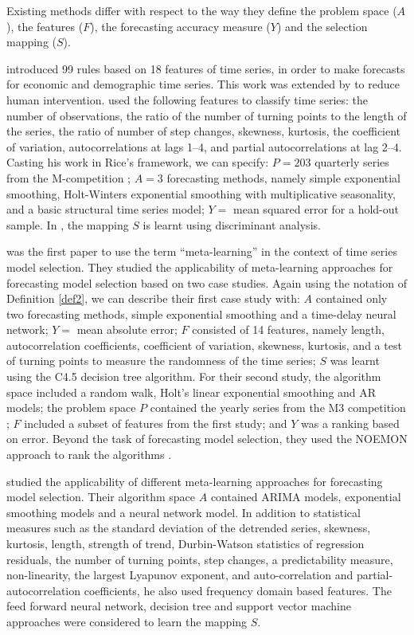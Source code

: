 \documentclass[11pt,a4paper,]{article}
\theoremstyle{definition}
\theoremstyle{definition}
\theoremstyle{definition}
\theoremstyle{remark}
\begin{document}
Existing methods differ with respect to the way they define the problem
space (\(A\)), the features (\(F\)), the forecasting accuracy measure
(\(Y\)) and the selection mapping (\(S\)).

\textcite{collopy1992rule} introduced 99 rules based on 18 features of
time series, in order to make forecasts for economic and demographic
time series. This work was extended by \textcite{armstrong2001s} to
reduce human intervention. \textcite{shah1997model} used the following
features to classify time series: the number of observations, the ratio
of the number of turning points to the length of the series, the ratio
of number of step changes, skewness, kurtosis, the coefficient of
variation, autocorrelations at lags 1--4, and partial autocorrelations
at lag 2--4. Casting his work in Rice's framework, we can specify:
\(P=203\) quarterly series from the M-competition
\autocite{makridakis1982accuracy}; \(A=3\) forecasting methods, namely
simple exponential smoothing, Holt-Winters exponential smoothing with
multiplicative seasonality, and a basic structural time series model;
\(Y=\) mean squared error for a hold-out sample. In
\textcite{shah1997model}, the mapping \(S\) is learnt using discriminant
analysis.

\textcite{prudencio2004meta} was the first paper to use the term
``meta-learning'' in the context of time series model selection. They
studied the applicability of meta-learning approaches for forecasting
model selection based on two case studies. Again using the notation of
Definition \ref{def2}, we can describe their first case study with:
\(A\) contained only two forecasting methods, simple exponential
smoothing and a time-delay neural network; \(Y=\) mean absolute error;
\(F\) consisted of 14 features, namely length, autocorrelation
coefficients, coefficient of variation, skewness, kurtosis, and a test
of turning points to measure the randomness of the time series; \(S\)
was learnt using the C4.5 decision tree algorithm. For their second
study, the algorithm space included a random walk, Holt's linear
exponential smoothing and AR models; the problem space \(P\) contained
the yearly series from the M3 competition \autocite{makridakis2000m3};
\(F\) included a subset of features from the first study; and \(Y\) was
a ranking based on error. Beyond the task of forecasting model
selection, they used the NOEMON approach to rank the algorithms
\autocite{kalousis1999noemon}.

\textcite{lemke2010meta} studied the applicability of different
meta-learning approaches for forecasting model selection. Their
algorithm space \(A\) contained ARIMA models, exponential smoothing
models and a neural network model. In addition to statistical measures
such as the standard deviation of the detrended series, skewness,
kurtosis, length, strength of trend, Durbin-Watson statistics of
regression residuals, the number of turning points, step changes, a
predictability measure, non-linearity, the largest Lyapunov exponent,
and auto-correlation and partial-autocorrelation coefficients, he also
used frequency domain based features. The feed forward neural network,
decision tree and support vector machine approaches were considered to
learn the mapping \(S\).
\end{document}
